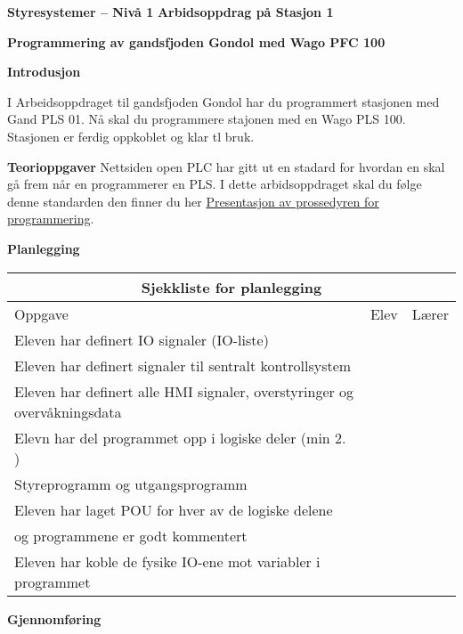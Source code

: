 

\noindent

\vskip 5pt
\begin{center}
\vskip 5pt 
\textbf{Styresystemer -- Nivå 1 }
\vskip 5pt 
\textbf{Arbidsoppdrag på Stasjon 1}
\vskip 5pt 

\vskip 5pt 
\textbf{Programmering av gandsfjoden Gondol med Wago PFC 100}
\end{center}
\vskip 5pt 
\textbf{Introdusjon}

\vskip 5pt 
I Arbeidsoppdraget til gandsfjoden Gondol har du programmert stasjonen med Gand PLS 01. Nå skal du programmere stajonen med en Wago PLS 100. Stasjonen er ferdig oppkoblet og klar tl bruk.


\vskip 5pt 
\vskip 5pt 
\textbf{Teorioppgaver}
\vskip 5pt 
Nettsiden open PLC har gitt ut en stadard for hvordan en skal gå frem når en programmerer en PLS. I dette arbidsoppdraget skal du følge denne standarden den finner du her \href{https://rfka-my.sharepoint.com/:p:/g/personal/fred-olav_mosdal_skole_rogfk_no/EVXQGPn90WdIpSuDzhhkKIMBdVsQ1ozwb4glbCEAFAfRxg?e=Z9zaSK}{Presentasjon av prossedyren for programmering}. 

\vskip 10pt 
\textbf{Planlegging}

\begin{center}
\begin{tabular}{ | m{12cm} | m{1cm}| m{1cm} | } 
\hline
\multicolumn{3}{|c|}{\textbf{Sjekkliste for planlegging}} \\
\hline
Oppgave	& Elev & Lærer \\ 
\hline
	Eleven har definert IO signaler (IO-liste)&&\\
\hline
	Eleven har definert signaler til sentralt kontrollsystem &&\\
\hline
	
	Eleven har definert alle HMI signaler, overstyringer og overvåkningsdata &&\\
\hline
	Elevn har del programmet opp i logiske deler (min 2. ) &&\\ 	
	Styreprogramm og utgangsprogramm &&\\
	\hline
	Eleven har laget POU for hver av de logiske delene &&\\
	og programmene er godt kommentert &&\\
	\hline
	Eleven har koble de fysike IO-ene mot variabler i programmet &&\\
	\hline
\end{tabular}
\end{center}
\vskip 10pt 
\vskip 10pt 
\textbf{Gjennomføring}


